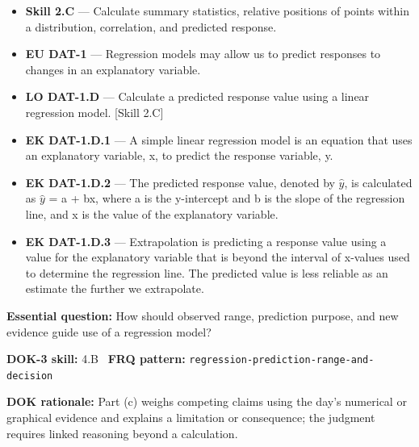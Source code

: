 \documentclass[11pt]{article}
\begin{document}


{\small
\begin{itemize}[leftmargin=1.5em,itemsep=2pt,topsep=2pt]
  \item \textbf{Skill 2.C} --- Calculate summary statistics, relative positions of points within a distribution, correlation, and predicted response.
  \item \textbf{EU DAT-1} --- Regression models may allow us to predict responses to changes in an explanatory variable.
  \item \textbf{LO DAT-1.D} --- Calculate a predicted response value using a linear regression model. [Skill 2.C]
  \item \textbf{EK DAT-1.D.1} --- A simple linear regression model is an equation that uses an explanatory variable, x, to predict the response variable, y.
  \item \textbf{EK DAT-1.D.2} --- The predicted response value, denoted by $\widehat{y}$, is calculated as $\widehat{y}$ = a + bx, where a is the y-intercept and b is the slope of the regression line, and x is the value of the explanatory variable.
  \item \textbf{EK DAT-1.D.3} --- Extrapolation is predicting a response value using a value for the explanatory variable that is beyond the interval of x-values used to determine the regression line. The predicted value is less reliable as an estimate the further we extrapolate.
\end{itemize}
}
\textbf{Essential question:} How should observed range, prediction purpose, and new evidence guide use of a regression model?\par
\textbf{DOK-3 skill:} 4.B \textperiodcentered\ \textbf{FRQ pattern:} {\small\texttt{regression-\allowbreak{}prediction-\allowbreak{}range-\allowbreak{}and-\allowbreak{}decision}}\par
\textbf{DOK rationale:} Part (c) weighs competing claims using the day's numerical or graphical evidence and explains a limitation or consequence; the judgment requires linked reasoning beyond a calculation.\par
\end{document}
